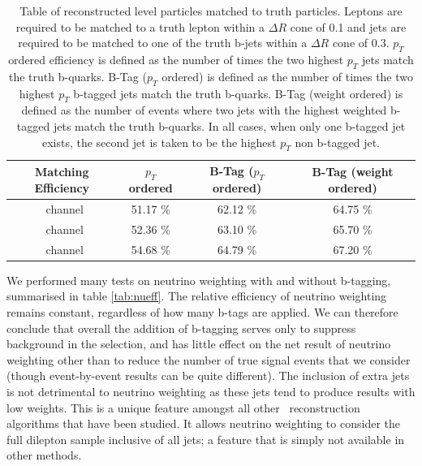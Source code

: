 \begin{table}[!h]
	\begin{center}
	\begin{tabular}{ c c c c }
	\hline
	Matching Efficiency & $p_T$ ordered & B-Tag ($p_T$ ordered) & B-Tag (weight ordered) \\
	\hline
	\ee\ channel        & 51.17 \%      & 62.12 \%              & 64.75 \%               \\
	\mumu\ channel      & 52.36 \%      & 63.10 \%              & 65.70 \%               \\
	\emu\ channel       & 54.68 \%      & 64.79 \%              & 67.20 \%               \\
	\hline
	\end{tabular}
	\end{center}
	\caption{Table of reconstructed level particles matched to truth particles. Leptons are required to be matched to a truth lepton within a $\Delta R$ cone of 0.1 and jets are required to be matched to one of the truth b-jets within a $\Delta R$ cone of $0.3$. $p_T$ ordered efficiency is defined as the number of times the two highest $p_T$ jets match the truth b-quarks. B-Tag ($p_T$ ordered) is defined as the number of times the two highest $p_T$ b-tagged jets match the truth b-quarks. B-Tag (weight ordered) is defined as the number of events where two jets with the highest weighted b-tagged jets match the truth b-quarks. In all cases, when only one b-tagged jet exists, the second jet is taken to be the highest $p_T$ non b-tagged jet. }
	\label{tab:btag_eff}
\end{table}

We performed many tests on neutrino weighting with and without b-tagging, summarised in table \ref{tab:nueff}. The relative efficiency of neutrino weighting remains constant, regardless of how many b-tags are applied. We can therefore conclude that overall the addition of b-tagging serves only to suppress background in the selection, and has little effect on the net result of neutrino weighting other than to reduce the number of true signal events that we consider (though event-by-event results can be quite different). The inclusion of extra jets is not detrimental to neutrino weighting as these jets tend to produce results with low weights. This is a unique feature amongst all other \ttbar\ reconstruction algorithms that have been studied. It allows neutrino weighting to consider the full dilepton sample inclusive of all jets; a feature that is simply not available in other methods. 

